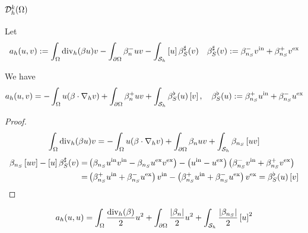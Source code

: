 \subsection{$\mathcal{D}^k_h(\Omega)$}\label{subsec:}
%
Let
%
\begin{equation}\label{eq:}
a_h(u,v) := \int_{\Omega}\operatorname{div}_h(\beta u) v - \int_{\partial\Omega} \beta_n^- uv - \int_{\mathcal S_h}\left[u\right]\beta_S^{\sharp}(v)
\quad \beta_S^{\sharp}(v) := \beta_{n_S}^{-}v^{\rm in} + \beta_{n_S}^{+}v^{\rm ex}
\end{equation}
%
\begin{lemma}\label{lemma:}
We have
%
\begin{equation}\label{eq:}
a_h(u,v) = - \int_{\Omega}u (\beta\cdot\nabla_h v) + \int_{\partial\Omega} \beta_n^+ uv  + \int_{\mathcal S_h}\beta_S^{\flat}(u) \left[v\right],
\quad \beta_S^{\flat}(u) := \beta_{n_S}^{+}u^{\rm in} + \beta_{n_S}^{-}u^{\rm ex}
\end{equation}
%
\end{lemma}
%
\begin{proof}
%
\begin{align*}
\int_{\Omega}\operatorname{div}_h(\beta u) v = - \int_{\Omega}u (\beta\cdot\nabla_h v) + \int_{\partial\Omega} \beta_n uv + \int_{\mathcal S_h}\beta_{n_S} \left[uv\right]
\end{align*}
%
%
\begin{align*}
\beta_{n_S} \left[uv\right] - \left[u\right] \beta_S^{\sharp}(v)
=&  \left(\beta_{n_S}u^{\rm in} v^{\rm in}-\beta_{n_S}u^{\rm ex}v^{\rm ex} \right) - \left(u^{\rm in} -u^{\rm ex}\right)\left(\beta_{n_S}^{-}v^{\rm in} + \beta_{n_S}^{+}v^{\rm ex}\right)\\
=& \left(\beta_{n_S}^{+}u^{\rm in} + \beta_{n_S}^{-}u^{\rm ex}\right) v^{\rm in} - \left(\beta_{n_S}^{+}u^{\rm in} + \beta_{n_S}^{-}u^{\rm ex} \right) v^{\rm ex} = \beta_S^{\flat}(u) \left[v\right]
\end{align*}
%
\end{proof}
%
\begin{corollary}\label{cor:}
%
\begin{equation}\label{eq:}
a_h(u,u) = \int_{\Omega}\frac{\operatorname{div}_h(\beta)}{2} u^2 + \int_{\partial\Omega} \frac{\left|\beta_n\right|}{2} u^2+ \int_{\mathcal S_h}\frac{\left|\beta_{n_S}\right|}{2}\left[u\right]^2
\end{equation}
%
\end{corollary}
%

